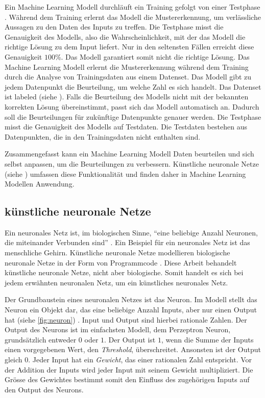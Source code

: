 Ein Machine Learning Modell durchläuft ein Training gefolgt von einer Testphase
\cite{noauthor_training_nodate}. Während dem Training erlernt das Modell die
Mustererkennung, um verlässliche Aussagen zu den Daten des Inputs zu treffen.
Die Testphase misst die Genauigkeit des Modells, also die Wahrscheinlichkeit,
mit der das Modell die richtige Lösung zu dem Input liefert. Nur in den seltensten
Fällen erreicht diese Genauigkeit $100\%$. Das Modell garantiert somit nicht die
richtige Lösung. Das Machine Learning Modell erlernt die Mustererkennung während
dem Training durch die Analyse von Trainingsdaten aus einem Datenset. Das Modell
gibt zu jedem Datenpunkt die Beurteilung, um welche Zahl es sich handelt. Das
Datenset ist labeled (siehe ). Falls die Beurteilung des
Modells nicht mit der bekannten korrekten Lösung übereinstimmt, passt sich das
Modell automatisch an. Dadurch soll die Beurteilungen für zukünftige Datenpunkte
genauer werden. Die Testphase misst die Genauigkeit des Modells auf Testdaten.
Die Testdaten bestehen aus Datenpunkten, die in den Trainingsdaten nicht
enthalten sind.
 
Zusammengefasst kann ein Machine Learning Modell Daten beurteilen und sich
selbst anpassen, um die Beurteilungen zu verbessern. Künstliche neuronale Netze
(siehe ) umfassen diese Funktionalität und finden daher in
Machine Learning Modellen Anwendung.
 
\subsection{künstliche neuronale Netze}\label{sub:t_ml_nn} Ein neuronales Netz
ist, im biologischen Sinne, ``eine beliebige Anzahl Neuronen, die miteinander
Verbunden sind'' \cite{noauthor_neuronales_2021}. Ein Beispiel für ein neuronales
Netz ist das menschliche Gehirn. Künstliche neuronale Netze modellieren
biologische neuronale Netze in der Form von Programmcode
\cite{noauthor_artificial_nodate}. Diese Arbeit behandelt künstliche neuronale
Netze, nicht aber biologische. Somit handelt es sich bei jedem erwähnten
neuronalen Netz, um ein künstliches neuronales Netz.
 
Der Grundbaustein eines neuronalen Netzes ist das Neuron. Im Modell stellt das
Neuron ein Objekt dar, das eine beliebige Anzahl Inputs, aber nur einen Output
hat (siehe \autoref{fig:neuron}) \cite{pramoditha_concept_2021}. Input und
Output sind hierbei rationale Zahlen. Der Output des Neurons ist im einfachsten
Modell, dem Perzeptron Neuron, grundsätzlich entweder $0$ oder $1$. Der Output ist
$1$, wenn die Summe der Inputs einen vorgegebenen Wert, den \emph{Threshold},
überschreitet. Ansonsten ist der Output gleich $0$. Jeder Input hat ein
\emph{Gewicht}, das einer rationalen Zahl entspricht. Vor der Addition der
Inputs wird jeder Input mit seinem Gewicht multipliziert. Die Grösse des
Gewichtes bestimmt somit den Einfluss des zugehörigen Inputs auf den Output des
Neurons. \cite{nielsen_neural_2015}\cite{simplilearn_what_2021}
 
